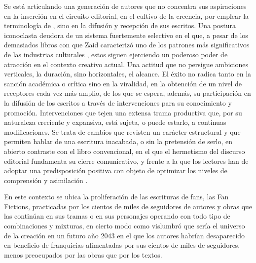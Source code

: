 \documentclass[spanish]{textolivre}
\begin{document}
Se está articulando una generación de autores que no concentra sus aspiraciones en la inserción en el circuito editorial, en el cultivo de la creencia, por emplear la terminología de \textcite{bourdieu_reglas_2018}, sino en la difusión y recepción de sus escritos. Una postura iconoclasta deudora de un sistema fuertemente selectivo en el que, a pesar de los demasiados libros con que Zaid caracterizó uno de los patrones más significativos de las industrias culturales \cite{zaid_demasiados_2010}, estos siguen ejerciendo un poderoso poder de atracción en el contexto creativo actual. Una actitud que no persigue ambiciones verticales, la duración, sino horizontales, el alcance. El éxito no radica tanto en la sanción académica o crítica sino en la viralidad, en la obtención de un nivel de receptores cada vez más amplio, de los que se espera, además, su participación en la difusión de los escritos a través de intervenciones para su conocimiento y promoción. Intervenciones que tejen una extensa trama productiva que, por su naturaleza creciente y expansiva, está sujeta, o puede estarlo, a continuas modificaciones. Se trata de cambios que revisten un carácter estructural y que permiten hablar de una escritura inacabada, o sin la pretensión de serlo, en abierto contraste con el libro convencional, en el que el hermetismo del discurso editorial fundamenta su cierre comunicativo, y frente a la que los lectores han de adoptar una predisposición positiva con objeto de optimizar los niveles de comprensión y asimilación \cite{baron_how_2021}.

En este contexto se ubica la proliferación de las escrituras de fans, las Fan Fictions, practicadas por los cientos de miles de seguidores de autores y obras que las continúan en sus tramas o en sus personajes operando con todo tipo de combinaciones y mixturas, en cierto modo como vislumbró \textcite{morrison_fiction_2013} que sería el universo de la creación en un futuro año 2043 en el que los autores habrían desaparecido en beneficio de franquicias alimentadas por sus cientos de miles de seguidores, menos preocupados por las obras que por  los textos.
\end{document}

